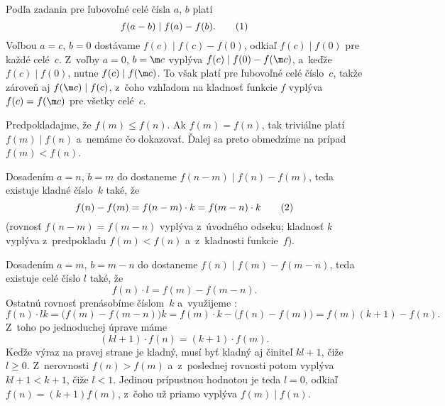 {%
Podľa zadania pre ľubovoľné celé čísla $a$, $b$ platí
$$
f(a-b)\mid f(a)-f(b).\tag1
$$
Voľbou $a=c$, $b=0$ dostávame $f(c)\mid f(c)-f(0)$, odkiaľ $f(c)\mid f(0)$ pre každé celé~$c$. Z~voľby $a=0$, $b=\m c$ vyplýva $f(c)\mid f(0)-f(\m c)$, a~keďže $f(c)\mid f(0)$, nutne $f(c)\mid f(\m c)$. To však platí pre ľubovoľné celé číslo~$c$, takže zároveň aj $f(\m c)\mid f(c)$, z~čoho vzhľadom na kladnosť funkcie $f$ vyplýva $f(c)=f(\m c)$ pre všetky celé~$c$.

Predpokladajme, že $f(m)\le f(n)$. Ak $f(m)=f(n)$, tak triviálne platí $f(m)\mid f(n)$ a~nemáme čo dokazovať. Ďalej sa preto obmedzíme na prípad $f(m)<f(n)$.

Dosadením $a=n$, $b=m$ do  dostaneme $f(n-m)\mid f(n)-f(m)$, teda existuje kladné číslo~$k$ také, že
$$
f(n)-f(m)=f(n-m)\cdot k=f(m-n)\cdot k\tag2
$$
(rovnosť $f(n-m)=f(m-n)$ vyplýva z~úvodného odseku; kladnosť $k$ vyplýva z~predpokladu $f(m)<f(n)$ a~z~kladnosti funkcie~$f$).

Dosadením $a=m$, $b=m-n$ do  dostaneme $f(n)\mid f(m)-f(m-n)$, teda existuje celé číslo $l$ také, že
$$
f(n)\cdot l = f(m)-f(m-n).
$$
Ostatnú rovnosť prenásobíme číslom~$k$ a~využijeme :
$$
f(n)\cdot lk = \bigl(f(m)-f(m-n)\bigr)k=f(m)\cdot k - \bigl(f(n)-f(m)\bigr)=f(m)(k+1)-f(n).
$$
Z~toho po jednoduchej úprave máme
$$
(kl+1)\cdot f(n)=(k+1)\cdot f(m).
$$
Keďže výraz na pravej strane je kladný, musí byť kladný aj činiteľ $kl+1$, čiže $l\ge0$. Z~nerovnosti $f(n)>f(m)$ a~z~poslednej rovnosti potom vyplýva $kl+1<k+1$, čiže $l<1$. Jedinou prípustnou hodnotou je teda $l=0$, odkiaľ $f(n)=(k+1)f(m)$, z~čoho už priamo vyplýva $f(m)\mid f(n)$.

}

